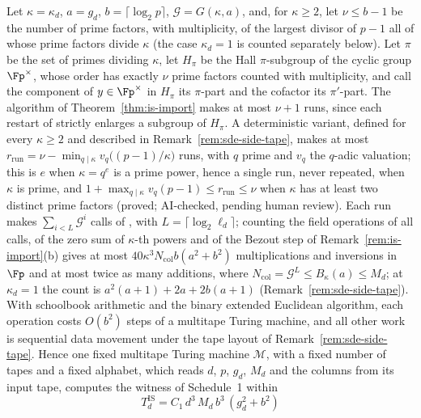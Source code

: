 \begin{remark}
\label{rem:is-runtime}
Let $\kappa = \kappa_d$, $a = g_d$, $b = \lceil\log_2 p\rceil$, $\mathcal{G} = G(\kappa,a)$, and, for $\kappa \ge 2$, let $\nu \le b-1$ be the number of prime factors, with multiplicity, of the largest divisor of $p-1$ all of whose prime factors divide $\kappa$ (the case $\kappa_d = 1$ is counted separately below). Let $\pi$ be the set of primes dividing $\kappa$, let $H_\pi$ be the Hall $\pi$-subgroup of the cyclic group $\Fp^\times$, whose order has exactly $\nu$ prime factors counted with multiplicity, and call the component of $y \in \Fp^\times$ in $H_\pi$ its $\pi$-part and the cofactor its $\pi'$-part. The algorithm of Theorem~\ref{thm:is-import} makes at most $\nu+1$ runs, since each restart of \cite[Section~3.1]{IvanyosSantha2015} strictly enlarges a subgroup of $H_\pi$. A deterministic variant, defined for every $\kappa \ge 2$ and described in Remark~\ref{rem:sde-side-tape}, makes at most $r_{\mathrm{run}} = \nu - \min_{q \mid \kappa} v_q\bigl((p-1)/\kappa\bigr)$ runs, with $q$ prime and $v_q$ the $q$-adic valuation; this is $e$ when $\kappa = q^e$ is a prime power, hence a single run, never repeated, when $\kappa$ is prime, and $1 + \max_{q \mid \kappa} v_q(p-1) \le r_{\mathrm{run}} \le \nu$ when $\kappa$ has at least two distinct prime factors (proved; AI-checked, pending human review). Each run makes $\sum_{i<L}\mathcal{G}^i$ calls of \cite[Theorem~11]{IvanyosSantha2015}, with $L = \lceil\log_2 \ell_d\rceil$; counting the field operations of all calls, of the zero sum of $\kappa$-th powers and of the Bezout step of Remark~\ref{rem:is-import}(b) gives at most $40\kappa^3 N_{\mathrm{col}} b(a^2+b^2)$ multiplications and inversions in $\Fp$ and at most twice as many additions, where $N_{\mathrm{col}} = \mathcal{G}^{L} \le B_{\kappa}(a) \le M_d$; at $\kappa_d = 1$ the count is $a^2(a+1)+2a+2b(a+1)$ (Remark~\ref{rem:sde-side-tape}). With schoolbook arithmetic and the binary extended Euclidean algorithm, each operation costs $O(b^2)$ steps of a multitape Turing machine, and all other work is sequential data movement under the tape layout of Remark~\ref{rem:sde-side-tape}. Hence one fixed multitape Turing machine $\mathcal{M}$, with a fixed number of tapes and a fixed alphabet, which reads $d$, $p$, $g_d$, $M_d$ and the columns from its input tape, computes the witness of Schedule~1 within
\[
  T^{\mathrm{IS}}_d = C_1\, d^3\, M_d\, b^3\,(g_d^2 + b^2)
\]
\end{remark}
